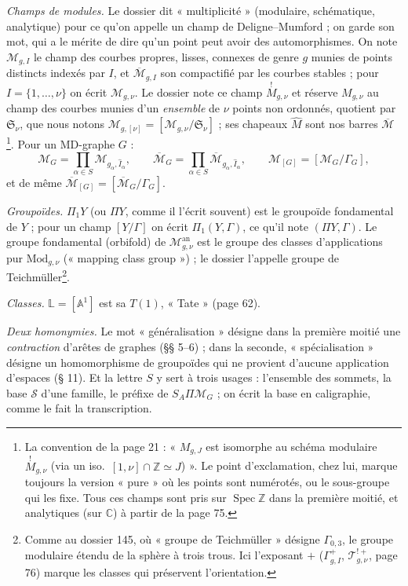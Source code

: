 \documentclass[11pt,a4paper]{article}
\begin{document}
\emph{Champs de modules.} Le dossier dit « multiplicité » (modulaire,
schématique, analytique) pour ce qu'on appelle un champ de Deligne--Mumford ; on
garde son mot, qui a le mérite de dire qu'un point peut avoir des automorphismes.
On note $\mathcal{M}_{g,I}$ le champ des courbes propres, lisses, connexes de
genre $g$ munies de points distincts indexés par $I$, et
$\overline{\mathcal{M}}_{g,I}$ son compactifié par les courbes stables ; pour $I
= \{1, \dots, \nu\}$ on écrit $\mathcal{M}_{g,\nu}$. Le dossier note ce champ
$\overset{!}{M}_{g,\nu}$ et réserve $M_{g,\nu}$ au champ des courbes munies d'un
\emph{ensemble} de $\nu$ points non ordonnés, quotient par $\mathfrak{S}_\nu$, que
nous notons $\mathcal{M}_{g,[\nu]} = [\mathcal{M}_{g,\nu}/\mathfrak{S}_\nu]$ ; ses
chapeaux $\widehat{M}$ sont nos barres $\overline{\mathcal{M}}$\footnote{La
convention de la page 21 : « $M_{g,J}$ est isomorphe au schéma modulaire
$\overset{!}{M}_{g,\nu}$ (via un iso.\ $[1, \nu] \cap \mathbb{Z} \simeq J$) ». Le
point d'exclamation, chez lui, marque toujours la version « pure » où les
points sont numérotés, ou le sous-groupe qui les fixe. Tous ces champs sont pris
sur $\operatorname{Spec} \mathbb{Z}$ dans la première moitié, et analytiques
(sur $\mathbb{C}$) à partir de la page 75.}. Pour un MD-graphe $G$ :
\[
\mathcal{M}_G = \prod_{\alpha \in S} \mathcal{M}_{g_\alpha, \widehat{I}_\alpha},
\qquad \overline{\mathcal{M}}_G = \prod_{\alpha \in S}
\overline{\mathcal{M}}_{g_\alpha, \widehat{I}_\alpha}, \qquad
\mathcal{M}_{[G]} = [\mathcal{M}_G/\Gamma_G],
\]
et de même $\overline{\mathcal{M}}_{[G]} = [\overline{\mathcal{M}}_G/\Gamma_G]$.

\emph{Groupoïdes.} $\Pi_1 Y$ (ou $\Pi Y$, comme il l'écrit souvent) est le
groupoïde fondamental de $Y$ ; pour un champ $[Y/\Gamma]$ on écrit $\Pi_1(Y,
\Gamma)$, ce qu'il note $(\Pi Y, \Gamma)$. Le groupe fondamental (orbifold) de
$\mathcal{M}_{g,\nu}^{\mathrm{an}}$ est le groupe des classes d'applications pur
$\mathrm{Mod}_{g,\nu}$ (« mapping class group ») ; le dossier l'appelle groupe
de Teichmüller\footnote{Comme au dossier 145, où « groupe de Teichmüller »
désigne $\Gamma_{0,3}$, le groupe modulaire étendu de la sphère à trois trous.
Ici l'exposant $+$ ($\Gamma^{+}_{g,I}$, $\mathcal{T}^{!+}_{g,\nu}$, page 76)
marque les classes qui préservent l'orientation.}.

\emph{Classes.} $\mathbb{L} = [\mathbb{A}^1]$ est sa $T(1)$, « Tate » (page 62).

\emph{Deux homonymies.} Le mot « généralisation » désigne dans la première
moitié une \emph{contraction} d'arêtes de graphes (§§ 5--6) ; dans la seconde,
« spécialisation » désigne un homomorphisme de groupoïdes qui ne provient
d'aucune application d'espaces (§ 11). Et la lettre $S$ y sert à trois usages :
l'ensemble des sommets, la base $\mathcal{S}$ d'une famille, le préfixe de
$S_A\Pi\mathcal{M}_G$ ; on écrit la base en caligraphie, comme le fait la
transcription.
\end{document}
